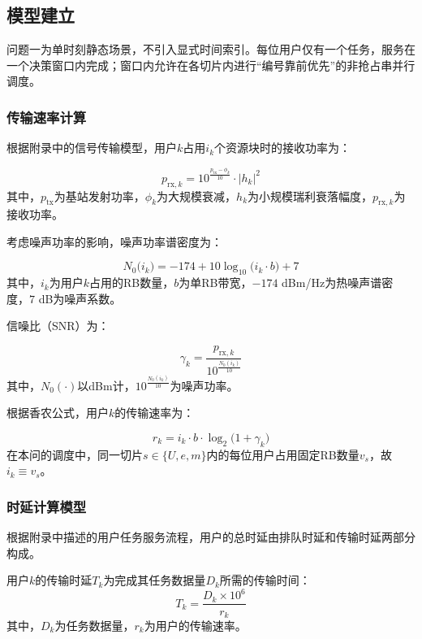 \subsection{模型建立}

问题一为单时刻静态场景，不引入显式时间索引。每位用户仅有一个任务，服务在一个决策窗口内完成；窗口内允许在各切片内进行“编号靠前优先”的非抢占串并行调度。

\subsubsection{传输速率计算}

根据附录中的信号传输模型，用户$k$占用$i_k$个资源块时的接收功率为：

\begin{equation}
p_{\text{rx},k} = 10^{\frac{p_{\text{tx}} - \phi_k}{10}} \cdot |h_k|^2 
\end{equation}
其中，$p_{\text{tx}}$为基站发射功率，$\phi_k$为大规模衰减，$h_k$为小规模瑞利衰落幅度，$p_{\text{rx},k}$为接收功率。

考虑噪声功率的影响，噪声功率谱密度为：

\begin{equation}
N_0\big(i_k\big) = -174 + 10\log_{10}\big(i_k \cdot b\big) + 7 
\end{equation}
其中，$i_k$为用户$k$占用的RB数量，$b$为单RB带宽，$-174$ dBm/Hz为热噪声谱密度，$7$ dB为噪声系数。

信噪比（SNR）为：

\begin{equation}
\gamma_k = \frac{p_{\text{rx},k}}{10^{\frac{N_0\left(i_k\right)}{10}}}
\end{equation}
其中，$N_0(\cdot)$以dBm计，$10^{\frac{N_0\left(i_k\right)}{10}}$为噪声功率。

根据香农公式，用户$k$的传输速率为：

\begin{equation}
r_k = i_k \cdot b \cdot \log_2\big(1 + \gamma_k\big) 
\end{equation}
在本问的调度中，同一切片$s\in\{U,e,m\}$内的每位用户占用固定RB数量$v_s$，故$i_k\equiv v_s$。

\subsubsection{时延计算模型}
根据附录中描述的用户任务服务流程，用户的总时延由排队时延和传输时延两部分构成。

用户$k$的传输时延$T_k$为完成其任务数据量$D_k$所需的传输时间：
\begin{equation}
T_k = \frac{D_k \times 10^6}{r_k} 
\end{equation}
其中，$D_k$为任务数据量，$r_k$为用户的传输速率。

